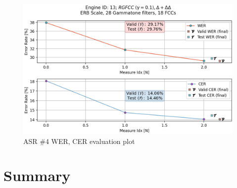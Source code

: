 \begin{figure}[H]
    \centering
    \includegraphics[width=0.95\linewidth]{ASR/images/asr13_wer.png}
    \caption{ASR \#4 WER, CER evaluation plot}\label{fig:wer_13}
\end{figure}

\section{Summary}










